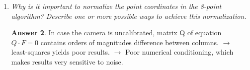 \documentclass[a4paper,12 pt]{article}
\theoremstyle{definition}
\theoremstyle{remark}
\theoremstyle{definition}
\theoremstyle{definition}
\theoremstyle{definition}
\theoremstyle{definition}
\theoremstyle{remark}
\theoremstyle{remark}
\theoremstyle{definition}
\theoremstyle{definition}
\newtheorem*{answer}{Answer}
\begin{document}
\begin{enumerate}
\begin{answer}
\begin{equation}
\begin{split}
\begin{pmatrix}
u_1^i\\
v_1^i\\
1
\end{pmatrix}&=0\\
\begin{pmatrix}
u_2^i\\
v_2^i\\
1
\end{pmatrix}^{T}\cdot F \cdot \begin{pmatrix}
u_1^i\\
v_1^i\\
1
\end{pmatrix}&=0,
\end{split}
\end{equation}
where $F$ is the \textbf{fundamental matrix}, which can be computed as
\begin{equation}
F=K_2^{-T}\cdot E \cdot K_1^{-1}=K_2^{-T}\cdot [T]_x\cdot R \cdot K_1^{-1}.
\end{equation}
\end{answer}
\item \textit{Why is it important to normalize the point coordinates in the 8-point algorithm? Describe one or more possible ways to achieve this normalization.}
\begin{answer}
In case the camera is uncalibrated, matrix Q of equation $Q\cdot F = 0$ contains  orders of magnitudes difference between columns. $\rightarrow$ least-squares yields poor results. $\rightarrow$ Poor numerical conditioning, which makes results very sensitive to noise.\\


\end{answer}
\end{enumerate}
\end{document}
